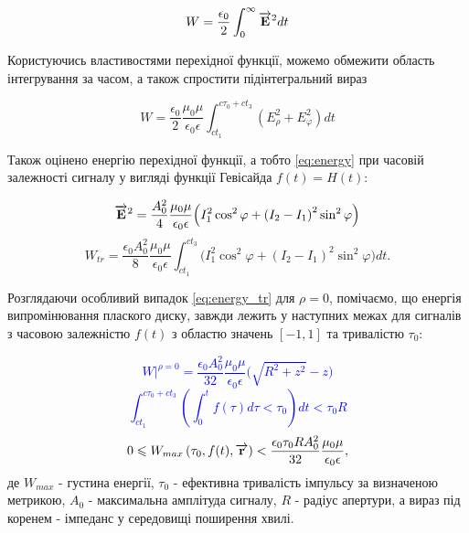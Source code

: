 \begin{equation} \label{eq:energy}
W = \frac{\epsilon_0}{2} \int_0^\infty \overrightarrow{\mathbf E}^2 dt
\end{equation}

Користуючись властивостями перехідної функції, можемо обмежити
область інтегрування за часом, а також спростити підінтегральний вираз

\begin{equation} \label{eq:energy}
W = \frac{\epsilon_0}{2} \frac{\mu_0 \mu}{\epsilon_0 \epsilon}
\int_{ct_1}^{c\tau_0+ct_3} \left( E_\rho^2 + E_\varphi^2 \right) dt
\end{equation}

Також оцінено енергію перехідної функції, а тобто \ref{eq:energy} при 
часовій залежності сигналу у вигляді функції Гевісайда $ f(t) = H(t) $:

\textcolor{blue}{ \begin{equation*} \begin{aligned}
\overrightarrow{\mathbf E}^2 = \frac{A_0^2}{4} \frac{\mu_0 \mu}{\epsilon_0 \epsilon}
\Big( I_1^2 \cos^2 \varphi + \left( I_2 - I_1 \right)^2 \sin^2 \varphi \Big)
\end{aligned} \end{equation*} }
%
\begin{equation} \label{eq:energy_tr}
W_{tr} = \frac{\epsilon_0 A_0^2}{8} \frac{\mu_0 \mu}{\epsilon_0 \epsilon}
\int_{ct_1}^{ct_3}  \Big( I_1^2 \cos^2 \varphi + 
\left( I_2 - I_1 \right)^2 \sin^2 \varphi \Big) dt.
\end{equation}

Розглядаючи особливий випадок \ref{eq:energy_tr} для $ \rho = 0 $, помічаємо,
що енергія випромінювання плаского диску, завжди лежить у наступних межах для 
сигналів з часовою залежністю $ f(t) $ з областю значень 
$ \left[ -1, 1 \right] $ та тривалістю $ \tau_0 $:

\textcolor{blue}{ \begin{equation*}
\left. W \right|^{\rho=0} = \frac{\epsilon_0 A_0^2}{32} 
\frac{\mu_0 \mu}{\epsilon_0 \epsilon} \Big( \sqrt{R^2+z^2} - z \Big)
\end{equation*} }
%
\textcolor{blue}{ \begin{equation*}
\int_{ct_1}^{c\tau_0+ct_3} 
\left( \int_0^t f(\tau) d \tau < \tau_0 \right) dt < \tau_0 R
\end{equation*} }
%
\begin{equation}
0 \leqslant W_{max} \left( \tau_0, f(t), \overrightarrow{\mathbf r} \right) < 
\frac{\epsilon_0 \tau_0 R A_0^2}{32} \frac{\mu_0 \mu}{\epsilon_0 \epsilon},
\end{equation}
%
де $ W_{max} $ - густина енергії, $ \tau_0 $ - ефективна тривалість імпульсу 
за визначеною метрикою, $ A_0 $ - максимальна амплітуда сигналу, $ R $ - 
радіус апертури, а вираз під коренем - імпеданс у середовищі поширення 
хвилі.

